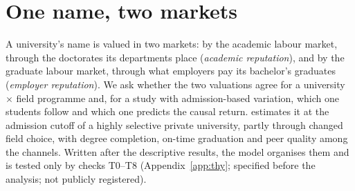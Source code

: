 \makeatletter
{}
\makeatother
\providecommand{\ci}[2]{$[#1,\allowbreak\,#2]$}

\section{One name, two markets}\label{sec:thy}

A university's name is valued in two markets: by the academic labour market, through the doctorates its
departments place (\emph{academic reputation}), and by the graduate labour market, through what employers pay its
bachelor's graduates (\emph{employer reputation}). We ask whether the two valuations agree
for a university $\times$ field programme and, for a study with admission-based variation, which one students follow
and which one predicts the causal return. \citet{anelli2020returns} estimates it at the admission
cutoff of a highly selective private university, partly through changed field choice, with degree completion,
on-time graduation and peer quality among the channels. Written after the descriptive
results, the model organises them and is tested only by checks T0--T8 (Appendix~\ref{app:thy}; specified before
the analysis; not publicly registered).

